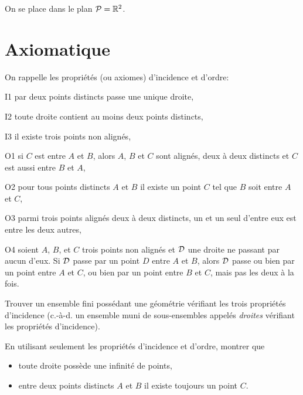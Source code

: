 \documentclass[a4paper,11pt,reqno]{amsart}
\begin{document}

\begin{convention}
  On se place dans le plan $\mathcal{P}=\mathbb{R}^2$.
\end{convention}

\section{Axiomatique}

On rappelle les propriétés (ou axiomes) d'incidence et d'ordre:

\begin{axioms}[leftmargin=3.5em]
  \item[I1] par deux points distincts passe une unique droite,
  \item[I2] toute droite contient au moins deux points distincts,
  \item[I3] il existe trois points non alignés,
  \item [O1] si $C$ est entre $A$ et $B$, alors $A$, $B$ et $C$ sont alignés, deux à deux distincts et $C$ est aussi entre $B$ et $A$,
  \item[O2] pour tous points distincts $A$ et $B$ il existe un point $C$ tel que $B$ soit entre $A$ et $C$,
  \item[O3] parmi trois points alignés deux à deux distincts, un et un seul d'entre eux est entre les deux autres,
  \item[O4] soient $A$, $B$, et $C$ trois points non alignés et $\mathcal{D}$ une droite ne passant par aucun d'eux. Si $\mathcal{D}$ passe par un point $D$ entre $A$ et $B$, alors $\mathcal{D}$ passe ou bien par un point entre $A$ et $C$, ou bien par un point entre $B$ et $C$, mais pas les deux à la fois.
\end{axioms}



\begin{exo}

  Trouver un ensemble fini possédant une géométrie vérifiant les trois propriétés d'incidence (c.-à-d. un ensemble muni de sous-ensembles appelés \emph{droites} vérifiant les propriétés d'incidence).
\end{exo}

\begin{exo}

  En utilisant seulement les propriétés d'incidence et d'ordre, montrer que
  \begin{itemize}
    \item toute droite possède une infinité de points,
    \item entre deux points distincts $A$ et $B$ il existe toujours un point $C$.
  \end{itemize}
\end{exo}
\end{document}
